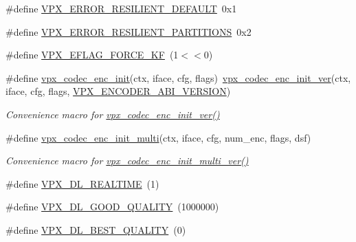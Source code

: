 \begin{DoxyCompactItemize}
\item 
\#define \hyperlink{group__encoder_ga651e80c00662995ac9151bb7433db3e5}{V\+P\+X\+\_\+\+E\+R\+R\+O\+R\+\_\+\+R\+E\+S\+I\+L\+I\+E\+N\+T\+\_\+\+D\+E\+F\+A\+U\+LT}~0x1
\item 
\#define \hyperlink{group__encoder_gac9b4ca99f12504d951589fac6854fc09}{V\+P\+X\+\_\+\+E\+R\+R\+O\+R\+\_\+\+R\+E\+S\+I\+L\+I\+E\+N\+T\+\_\+\+P\+A\+R\+T\+I\+T\+I\+O\+NS}~0x2
\item 
\#define \hyperlink{group__encoder_ga4c4f4e3cbb5225d2c6c050e2d1e948fa}{V\+P\+X\+\_\+\+E\+F\+L\+A\+G\+\_\+\+F\+O\+R\+C\+E\+\_\+\+KF}~(1$<$$<$0)
\item 
\#define \hyperlink{group__encoder_ga3d490a2a9a6acd7c9ef82a603155f3cf}{vpx\+\_\+codec\+\_\+enc\+\_\+init}(ctx,  iface,  cfg,  flags)~\hyperlink{group__encoder_ga1472ec347010fe5ef32766a299e57cc4}{vpx\+\_\+codec\+\_\+enc\+\_\+init\+\_\+ver}(ctx, iface, cfg, flags, \hyperlink{group__encoder_gaa4f0b52293c08ba672429c3a03648b9d}{V\+P\+X\+\_\+\+E\+N\+C\+O\+D\+E\+R\+\_\+\+A\+B\+I\+\_\+\+V\+E\+R\+S\+I\+ON})
\begin{DoxyCompactList}\small\item\em Convenience macro for \hyperlink{group__encoder_ga1472ec347010fe5ef32766a299e57cc4}{vpx\+\_\+codec\+\_\+enc\+\_\+init\+\_\+ver()} \end{DoxyCompactList}\item 
\#define \hyperlink{group__encoder_gad7ae1d930cf110d6fe70beafeacfd9c7}{vpx\+\_\+codec\+\_\+enc\+\_\+init\+\_\+multi}(ctx,  iface,  cfg,  num\+\_\+enc,  flags,  dsf)
\begin{DoxyCompactList}\small\item\em Convenience macro for \hyperlink{group__encoder_ga1c0415984a5469687f53613a5471f53d}{vpx\+\_\+codec\+\_\+enc\+\_\+init\+\_\+multi\+\_\+ver()} \end{DoxyCompactList}\item 
\#define \hyperlink{group__encoder_ga04253cc9ec1146d72fa8bb86bcf32144}{V\+P\+X\+\_\+\+D\+L\+\_\+\+R\+E\+A\+L\+T\+I\+ME}~(1)
\item 
\#define \hyperlink{group__encoder_ga5d00a9f9e10b9f49ca91e72c1f01c9fd}{V\+P\+X\+\_\+\+D\+L\+\_\+\+G\+O\+O\+D\+\_\+\+Q\+U\+A\+L\+I\+TY}~(1000000)
\item 
\#define \hyperlink{group__encoder_gab350573bea112f2fdf8e5677db3ac0da}{V\+P\+X\+\_\+\+D\+L\+\_\+\+B\+E\+S\+T\+\_\+\+Q\+U\+A\+L\+I\+TY}~(0)
\end{DoxyCompactItemize}
